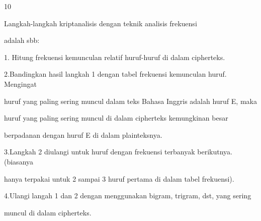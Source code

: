 \documentclass{article}
\begin{document}

10

Langkah-langkah kriptanalisis dengan teknik analisis frekuensi 

adalah sbb: 

1. Hitung frekuensi kemunculan relatif huruf-huruf di dalam cipherteks.

2.Bandingkan hasil langkah 1 dengan tabel frekuensi kemunculan huruf. Mengingat 

huruf yang paling sering muncul dalam teks Bahasa Inggris adalah huruf E, maka  

huruf yang paling sering muncul di dalam cipherteks kemungkinan besar 

berpadanan dengan huruf E di dalam plainteksnya. 

3.Langkah 2 diulangi untuk huruf dengan frekuensi terbanyak berikutnya. (biasanya 

hanya terpakai untuk 2 sampai 3 huruf pertama di dalam tabel frekuensi). 

4.Ulangi langah 1 dan 2 dengan menggunakan bigram, trigram, dst, yang sering 

muncul di dalam cipherteks.
\end{document}
